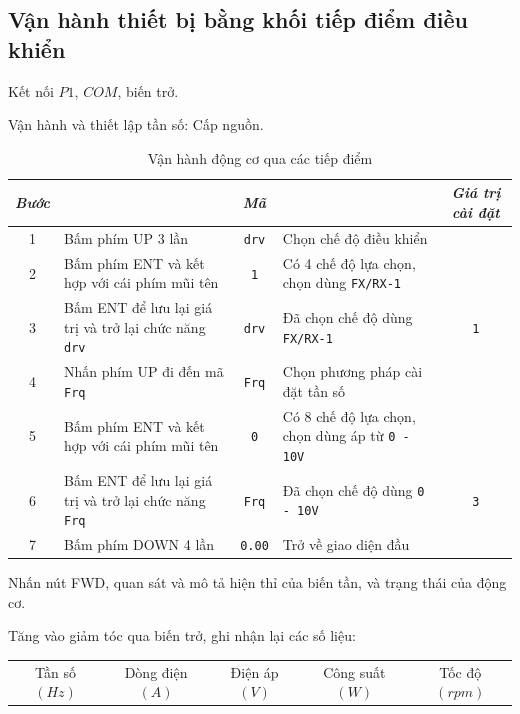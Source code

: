 \documentclass[13pt,a4paper]{extarticle}
\begin{document}
\subsection{Vận hành thiết bị bằng khối tiếp điểm điều khiển}
\begin{list}{--}{}
\item Kết nối $P1$, $COM$, biến trở.
\item Vận hành và thiết lập tần số: Cấp nguồn.
\begin{table}[!h]
\begin{center}
\begin{longtable}{|c|p{5cm}|c|p{5cm}|c|} \hline
\textit{Bước} & \centering{Lệnh} & \textit{Mã} & \centering{\textit{Mô tả}} & \textit{Giá trị cài đặt} \\ \hline
1 & Bấm phím UP 3 lần & \verb|drv| & Chọn chế độ điều khiển & \\ \hline
2 & Bấm phím ENT và kết hợp với cái phím mũi tên & \verb|1| & Có 4 chế độ lựa chọn, chọn dùng \verb|FX/RX-1| &  \\ \hline
3 & Bấm ENT để lưu lại giá trị và trở lại chức năng \verb|drv| & \verb|drv| & Đã chọn chế độ dùng \verb|FX/RX-1| & \verb|1| \\ \hline
4 & Nhấn phím UP đi đến mã \verb|Frq| & \verb|Frq| & Chọn phương pháp cài đặt tần số & \\ \hline
5 & Bấm phím ENT và kết hợp với cái phím mũi tên & \verb|0| & Có 8 chế độ lựa chọn, chọn dùng áp từ \verb|0 - 10V| &  \\ \hline
6 & Bấm ENT để lưu lại giá trị và trở lại chức năng \verb|Frq| & \verb|Frq| & Đã chọn chế độ dùng \verb|0 - 10V| & \verb|3| \\ \hline
7 & Bấm phím DOWN 4 lần & \verb|0.00| & Trở về giao diện đầu & \\ \hline
\end{longtable}
\end{center}
\caption{Vận hành động cơ qua các tiếp điểm}
\end{table}
\vspace{-.5cm}
\item Nhấn nút FWD, quan sát và mô tả hiện thỉ của biến tần, và trạng thái của động cơ.
\item Tăng vào giảm tóc qua biến trở, ghi nhận lại các số liệu:
\begin{longtable}{|c|c|c|c|c|c|c|c|}\hline
Tần số $(Hz)$ & \multicolumn{2}{|c|}{Dòng điện $(A)$} & \multicolumn{2}{|c|}{Điện áp $(V)$} & Công suất $(W)$ & \multicolumn{2}{|c|}{Tốc độ $(rpm)$} \\ \cline{2-5} \cline{7-8}

\end{longtable}
\end{list}
\end{document}
